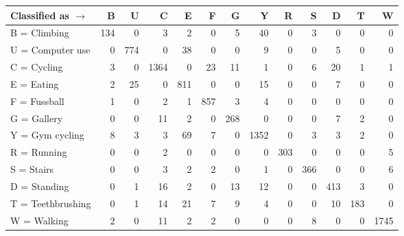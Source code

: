 \begin{tabular}{lrrrrrrrrrrrr}
\toprule
Classified as $\rightarrow$ &    B &    U &     C &    E &    F &    G &     Y &    R &    S &    D &    T &     W \\
\midrule
B = Climbing      &  134 &    0 &     3 &    2 &    0 &    5 &    40 &    0 &    3 &    0 &    0 &     0 \\
U = Computer use  &    0 &  774 &     0 &   38 &    0 &    0 &     9 &    0 &    0 &    5 &    0 &     0 \\
C = Cycling       &    3 &    0 &  1364 &    0 &   23 &   11 &     1 &    0 &    6 &   20 &    1 &     1 \\
E = Eating        &    2 &   25 &     0 &  811 &    0 &    0 &    15 &    0 &    0 &    7 &    0 &     0 \\
F = Fussball      &    1 &    0 &     2 &    1 &  857 &    3 &     4 &    0 &    0 &    0 &    0 &     0 \\
G = Gallery       &    0 &    0 &    11 &    2 &    0 &  268 &     0 &    0 &    0 &    7 &    2 &     0 \\
Y = Gym cycling   &    8 &    3 &     3 &   69 &    7 &    0 &  1352 &    0 &    3 &    3 &    2 &     0 \\
R = Running       &    0 &    0 &     2 &    0 &    0 &    0 &     0 &  303 &    0 &    0 &    0 &     5 \\
S = Stairs        &    0 &    0 &     3 &    2 &    2 &    0 &     1 &    0 &  366 &    0 &    0 &     6 \\
D = Standing      &    0 &    1 &    16 &    2 &    0 &   13 &    12 &    0 &    0 &  413 &    3 &     0 \\
T = Teethbrushing &    0 &    1 &    14 &   21 &    7 &    9 &     4 &    0 &    0 &   10 &  183 &     0 \\
W = Walking       &    2 &    0 &    11 &    2 &    2 &    0 &     0 &    0 &    8 &    0 &    0 &  1745 \\
\bottomrule
\end{tabular}
